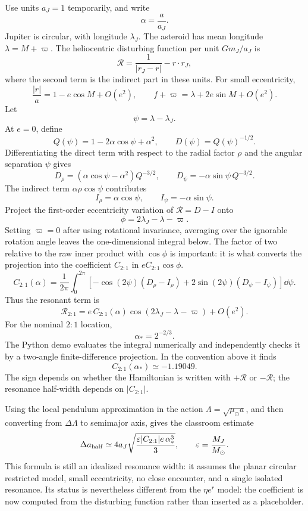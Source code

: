 Use units \(a_J=1\) temporarily, and write
\[
  \alpha=\frac{a}{a_J}.
\]
Jupiter is circular, with longitude \(\lambda_J\).  The asteroid has mean
longitude \(\lambda=M+\varpi\).  The heliocentric disturbing function per unit
\(Gm_J/a_J\) is
\[
  \mathcal R
  =
  \frac{1}{|r_J-r|}
  -
  r\cdot r_J ,
\]
where the second term is the indirect part in these units.  For small
eccentricity,
\[
  \frac{|r|}{a} = 1-e\cos M+O(e^2),
  \qquad
  f+\varpi=\lambda+2e\sin M+O(e^2).
\]
Let
\[
  \psi=\lambda-\lambda_J .
\]
At \(e=0\), define
\[
  Q(\psi)=1-2\alpha\cos\psi+\alpha^2,
  \qquad
  D(\psi)=Q(\psi)^{-1/2}.
\]
Differentiating the direct term with respect to the radial factor \(\rho\) and
the angular separation \(\psi\) gives
\[
  D_\rho=(\alpha\cos\psi-\alpha^2)Q^{-3/2},
  \qquad
  D_\psi=-\alpha\sin\psi\,Q^{-3/2}.
\]
The indirect term \(\alpha\rho\cos\psi\) contributes
\[
  I_\rho=\alpha\cos\psi,
  \qquad
  I_\psi=-\alpha\sin\psi .
\]
Project the first-order eccentricity variation of
\(\mathcal R=D-I\) onto
\[
  \phi=2\lambda_J-\lambda-\varpi .
\]
Setting \(\varpi=0\) after using rotational invariance, averaging over the
ignorable rotation angle leaves the one-dimensional integral below.  The factor
of two relative to the raw inner product with \(\cos\phi\) is important: it is
what converts the projection into the coefficient \(C_{2:1}\) in
\(eC_{2:1}\cos\phi\).
\[
  C_{2:1}(\alpha)
  =
  \frac{1}{2\pi}\int_0^{2\pi}
  \left[
  -\cos(2\psi)(D_\rho-I_\rho)
  +
  2\sin(2\psi)(D_\psi-I_\psi)
  \right]\dd\psi .
\]
Thus the resonant term is
\[
  \mathcal R_{2:1}
  =
  e\,C_{2:1}(\alpha)
  \cos(2\lambda_J-\lambda-\varpi)+O(e^2).
\]
For the nominal \(2:1\) location,
\[
  \alpha_*=2^{-2/3}.
\]
The Python demo evaluates the integral numerically and independently checks it
by a two-angle finite-difference projection.  In the convention above it finds
\[
  C_{2:1}(\alpha_*)\simeq -1.19049 .
\]
The sign depends on whether the Hamiltonian is written with \(+\mathcal R\) or
\(-\mathcal R\); the resonance half-width depends on \(|C_{2:1}|\).

Using the local pendulum approximation in the action \(\Lambda=\sqrt{\mu_\odot
a}\), and then converting from \(\Delta\Lambda\) to semimajor axis, gives the
classroom estimate
\[
  \Delta a_{\rm half}
  \simeq
  4a_J
  \sqrt{
    \frac{\varepsilon |C_{2:1}| e\,\alpha_*^3}{3}
  },
  \qquad
  \varepsilon=\frac{M_J}{M_\odot}.
\]
This formula is still an idealized resonance width: it assumes the planar
circular restricted model, small eccentricity, no close encounter, and a single
isolated resonance.  Its status is nevertheless different from the
\(\eta e^r\) model: the coefficient is now computed from the disturbing
function rather than inserted as a placeholder.

